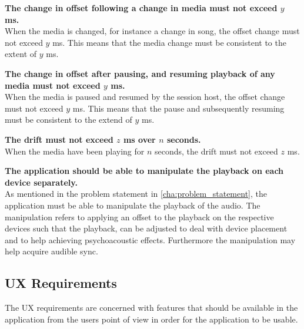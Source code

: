 \begin{eletterate}
\begin{eletterate}
        \item \textbf{The change in offset following a change in media must not exceed $y$ ms.} \hfill\\
            When the media is changed, for instance a change in song, the offset change must not exceed $y$ ms.
            This means that the media change must be consistent to the extent of $y$ ms.

        \item \textbf{The change in offset after pausing, and resuming playback of any media must not exceed $y$ ms.} \hfill\\
            When the media is paused and resumed by the session host, the offset change must not exceed $y$ ms.
            This means that the pause and subsequently resuming must be consistent to the extend of $y$ ms.

        \item \textbf{The drift must not exceed $z$ ms over $n$ seconds.} \hfill\\
            When the media have been playing for $n$ seconds, the drift must not exceed $z$ ms.
    \end{eletterate}

    \item\label{req:manipulate} \textbf{The application should be able to manipulate the playback on each device separately.} \hfill\\
        As mentioned in the problem statement in \cref{cha:problem_statement}, the application must be able to manipulate the playback of the audio.
        The manipulation refers to applying an offset to the playback on the respective devices such that the playback, can be adjusted to deal with device placement and to help achieving psychoacoustic effects.
        Furthermore the manipulation may help acquire audible sync.
\end{eletterate}

\subsection*{\ac{UX} Requirements}
The \ac{UX} requirements are concerned with features that should be available in the application from the users point of view in order for the application to be usable.

